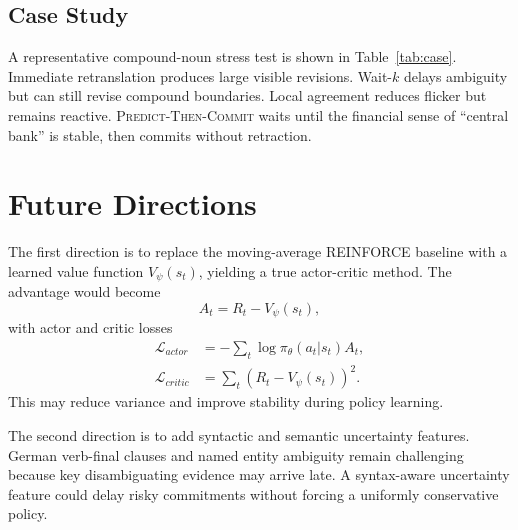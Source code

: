 \documentclass[conference]{IEEEtran}
\begin{document}
\subsection{Case Study}
A representative compound-noun stress test is shown in Table~\ref{tab:case}. Immediate retranslation produces large visible revisions. Wait-$k$ delays ambiguity but can still revise compound boundaries. Local agreement reduces flicker but remains reactive. \textsc{Predict-Then-Commit} waits until the financial sense of ``central bank'' is stable, then commits without retraction.

\begin{table}[t]
\centering
\caption{Compound noun stress test. Source: ``The central bank interest rate decision surprised investors.''}
\label{tab:case}
\end{table}

\section{Future Directions}
The first direction is to replace the moving-average REINFORCE baseline with a learned value function $V_\psi(s_t)$, yielding a true actor-critic method. The advantage would become
\begin{equation}
    A_t=R_t-V_\psi(s_t),
\end{equation}
with actor and critic losses
\begin{align}
    \mathcal{L}_{actor}&=-\sum_t \log\pi_\theta(a_t|s_t)A_t,\\
    \mathcal{L}_{critic}&=\sum_t (R_t-V_\psi(s_t))^2.
\end{align}
This may reduce variance and improve stability during policy learning.

The second direction is to add syntactic and semantic uncertainty features. German verb-final clauses and named entity ambiguity remain challenging because key disambiguating evidence may arrive late. A syntax-aware uncertainty feature could delay risky commitments without forcing a uniformly conservative policy.
\end{document}
